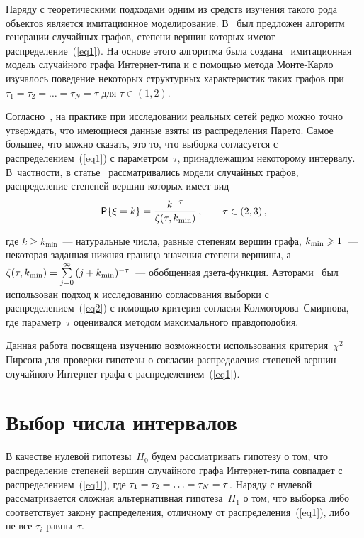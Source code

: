 \begin{multicols}{2}
Наряду с теоретическими подходами одним из средств изучения
такого рода объектов является имитационное моделирование. В~\cite{RN, Tang} 
был предложен алгоритм генерации случайных графов,
степени вершин которых имеют распределение~(\ref{eq1}). На основе
этого алгоритма была создана~\cite{Ler} имитационная модель
случайного графа Ин\-тер\-нет-ти\-па и с помощью метода Мон\-те-Кар\-ло
изучалось поведение некоторых структурных характеристик таких
графов при $\tau_1=\tau_2=\dots=\tau_N=\tau$ для $\tau\in(1,2)$.

Согласно~\cite{Claus}, на практике при исследовании реальных сетей
редко можно точно утверждать, что имеющиеся данные взяты из
распределения Парето. Самое большее, что можно сказать, это то, что
выборка согласуется с распределением~(\ref{eq1}) с параметром~$\tau$, 
принадлежащим некоторому интервалу. В~частности, в статье~\cite{Claus} 
рассматривались модели случайных графов, распределение
степеней вершин которых имеет вид
\begin{equation}
\label{eq2}
{\sf P}\{\xi = k\} = \displaystyle\frac{\displaystyle k^{-\tau}\mathstrut}{\displaystyle \zeta(\tau,k_{\min})\mathstrut}\,, \qquad \tau
\in (2,3)\,,
\end{equation}

\noindent
где $k\geqslant k_{\min}$~--- натуральные числа, равные степеням
вершин графа, $k_{\min}\hm\geqslant 1$~--- некоторая заданная нижняя граница
значения степени вершины, а
$\zeta(\tau,k_{\min})\hm=\sum\limits_{j=0}^\infty{(j+k_{\min})^{-\tau}}$~---
обобщенная дзета-функция. Авторами~\cite{Claus} был использован
подход к исследованию согласования выборки с распределением~(\ref{eq2}) 
с помощью критерия согласия Кол\-мо\-го\-ро\-ва--Смир\-но\-ва, где
параметр~$\tau$ оценивался методом максимального правдоподобия.


Данная работа посвящена изучению воз\-мож\-ности использования
критерия~$\chi^2$ Пирсона для проверки гипотезы о согласии
распределения степеней вершин случайного Интернет-графа с
распределением~(\ref{eq1}).

\section{Выбор числа интервалов}

В качестве нулевой гипотезы~$H_0$ будем рас\-смат\-ри\-вать гипотезу о
том, что распределение степеней вершин случайного графа
Ин\-тер\-нет-ти\-па совпадает с распределением~(\ref{eq1}), где
$\tau_1\hm=\tau_2\hm=\dots\hm=\tau_N\hm=\tau$. Наряду с нулевой
рассматривается сложная альтернативная гипотеза~$H_1$ о том, что
выборка либо соответствует закону распределения, отличному от
распределения~(\ref{eq1}), либо не все $\tau_i$ равны~$\tau$.


\end{multicols}

